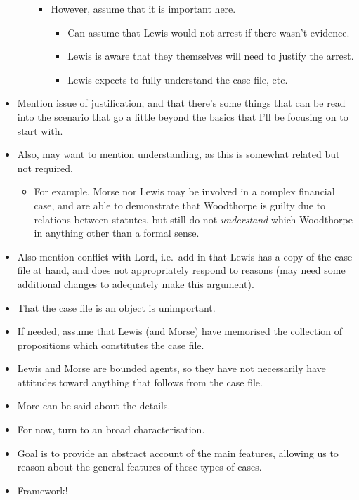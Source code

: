 \documentclass[10pt]{article}
\begin{document}
\begin{itemize}
\begin{itemize}
\begin{itemize}
\begin{itemize}
      \end{itemize}
    \item However, assume that it is important here.
      \begin{itemize}
      \item Can assume that Lewis would not arrest if there wasn't evidence.
      \item Lewis is aware that they themselves will need to justify the arrest.
      \item Lewis expects to fully understand the case file, etc.\
      \end{itemize}
    \end{itemize}
  \end{itemize}
\item Mention issue of justification, and that there's some things that can be read into the scenario that go a little beyond the basics that I'll be focusing on to start with.
\item Also, may want to mention understanding, as this is somewhat related but not required.
  \begin{itemize}
  \item For example, Morse nor Lewis may be involved in a complex financial case, and are able to demonstrate that Woodthorpe is guilty due to relations between statutes, but still do not \emph{understand} which Woodthorpe in anything other than a formal sense.
  \end{itemize}
\end{itemize}

\begin{itemize}
\item Also mention conflict with Lord, i.e.\ add in that Lewis has a copy of the case file at hand, and does not appropriately respond to reasons (may need some additional changes to adequately make this argument).
\end{itemize}

\begin{itemize}
\item That the case file is an object is unimportant.
\item If needed, assume that Lewis (and Morse) have memorised the collection of propositions which constitutes the case file.
\item Lewis and Morse are bounded agents, so they have not necessarily have attitudes toward anything that follows from the case file.
\end{itemize}

\begin{itemize}
\item More can be said about the details.
\item For now, turn to an broad characterisation.
\item Goal is to provide an abstract account of the main features, allowing us to reason about the general features of these types of cases.
\item Framework!
\end{itemize}
\end{document}
